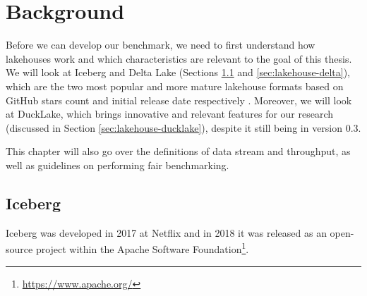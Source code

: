 \chapter{Background}\label{ch:background}



Before we can develop our benchmark, we need to first understand how lakehouses work and which characteristics are relevant to the goal of this thesis. We will look at Iceberg and Delta Lake (Sections \ref{sec:lakehouse-iceberg} and \ref{sec:lakehouse-delta}), which are the two most popular and more mature lakehouse formats based on GitHub stars count and initial release date respectively \cite{thedeltalakeprojectauthorsDeltaLake2026, Iceberg2025}. Moreover, we will look at DuckLake, which brings innovative and relevant features for our research (discussed in Section \ref{sec:lakehouse-ducklake}), despite it still being in version 0.3.

This chapter will also go over the definitions of data stream and throughput, as well as guidelines on performing fair benchmarking.


\section{Iceberg}\label{sec:lakehouse-iceberg}
Iceberg was developed in 2017 at Netflix and in 2018 it was released as an open-source project within the Apache Software Foundation\footnote{\url{https://www.apache.org/}}.

